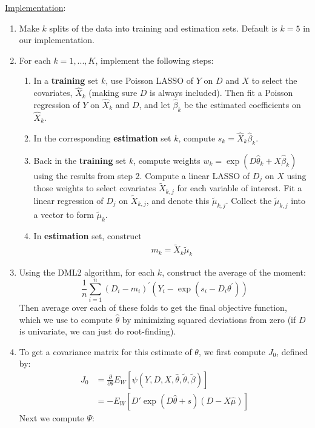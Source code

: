 \documentclass[11pt]{article}
\begin{document}
\noindent \underline{Implementation}:
\begin{enumerate}
	\item Make $k$ splits of the data into training and estimation sets. Default is $k=5$ in our implementation.
  \item For each $k = 1, ..., K$, implement the following steps:
  \begin{enumerate}
    \item In a \textbf{training} set $k$, use Poisson LASSO of $Y$ on $D$ and $X$ to select the covariates, $\hat{X}_k$ (making sure $D$ is always included). Then fit a Poisson regression of $Y$ on $\hat{X}_k$ and $D$, and let $\hat{\beta}_k$ be the estimated coefficients on $\hat{X}_k$.
  	\item In the corresponding \textbf{estimation} set $k$, compute $s_k = \hat{X}_k \hat{\beta}_k$.
  	\item Back in the \textbf{training} set $k$, compute weights $w_k = \exp(D\hat{\theta}_k + X\hat{\beta}_k)$ using the results from step 2.  Compute a linear LASSO of $D_j$ on $X$ using those weights to select covariates $\tilde{X}_{k,j}$ for each variable of interest. Fit a linear regression of $D_j$ on $\tilde{X}_{k,j}$, and denote this $\tilde{\mu}_{k,j}$. Collect the $\tilde{\mu}_{k,j}$ into a vector to form $\tilde{\mu}_k$.
  	\item In \textbf{estimation} set, construct
  	\begin{gather*}
  		m_k = \tilde{X}_k\tilde{\mu}_k
  	\end{gather*}
  \end{enumerate}
	\item Using the DML2 algorithm, for each $k$, construct the average of the moment:
	$$
	\frac{1}{n} \sum_{i=1}^{n}\left(D_{i}-m_{i}\right)^{\prime}\left(Y_{i}-\exp(s_{i}-D_{i} \theta^{\prime})\right)
	$$
	Then average over each of these folds to get the final objective function, which we use to compute
	$\hat{\theta}$ by minimizing squared deviations from zero (if $D$ is univariate, we can just do root-finding).
	\item To get a covariance matrix for this estimate of $\theta$, we first compute $J_0$, defined by:
	\begin{align*}
		J_0 &= \frac{\partial}{\partial \theta} E_W \left[\psi(Y,D,X,\hat{\theta},\tilde{\theta}, \tilde{\beta}) \right]\\
		&= -E_W\left[D'\exp(D\hat{\theta} + s)(D - X\hat{\mu}) \right]
	\end{align*}
	Next we compute $\Psi$:

\end{enumerate}
\end{document}
